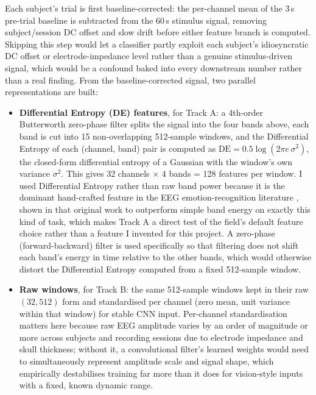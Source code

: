 \documentclass[11pt]{report}
\begin{document}
Each subject's trial is first baseline-corrected: the per-channel mean of
the 3\,s pre-trial baseline is subtracted from the 60\,s stimulus signal,
removing subject/session DC offset and slow drift before either feature
branch is computed. Skipping this step would let a classifier partly exploit
each subject's idiosyncratic DC offset or electrode-impedance level rather
than a genuine stimulus-driven signal, which would be a confound baked into
every downstream number rather than a real finding. From the
baseline-corrected signal, two parallel representations are built:
\begin{itemize}
  \item \textbf{Differential Entropy (DE) features}, for Track A: a 4th-order
        Butterworth \citep{butterworth1930filter} zero-phase filter splits
        the signal into the four bands above, each band is cut into 15
        non-overlapping 512-sample windows, and the Differential Entropy of
        each (channel, band) pair is computed as $\text{DE} = 0.5 \log(2\pi
        e \, \sigma^2)$, the closed-form differential entropy of a Gaussian
        with the window's own variance $\sigma^2$. This gives 32 channels
        $\times$ 4 bands = 128 features per window. I used Differential
        Entropy rather than raw band power because it is the dominant
        hand-crafted feature in the EEG emotion-recognition literature
        \citep{duan2013differential}, shown in that original work to
        outperform simple band energy on exactly this kind of task, which
        makes Track A a direct test of the field's default feature choice
        rather than a feature I invented for this project. A zero-phase
        (forward-backward) filter is used specifically so that filtering
        does not shift each band's energy in time relative to the other
        bands, which would otherwise distort the Differential Entropy
        computed from a fixed 512-sample window.
  \item \textbf{Raw windows}, for Track B: the same 512-sample windows kept
        in their raw $(32, 512)$ form and standardised per channel (zero
        mean, unit variance within that window) for stable CNN input.
        Per-channel standardisation matters here because raw EEG amplitude
        varies by an order of magnitude or more across subjects and
        recording sessions due to electrode impedance and skull thickness;
        without it, a convolutional filter's learned weights would need to
        simultaneously represent amplitude scale and signal shape, which
        empirically destabilises training far more than it does for
        vision-style inputs with a fixed, known dynamic range.
\end{itemize}
\end{document}
